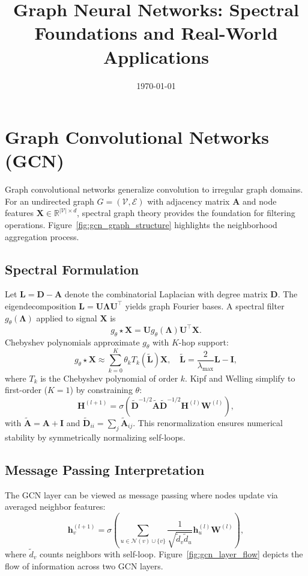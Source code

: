 \documentclass{article}
\title{Graph Neural Networks: Spectral Foundations and Real-World Applications}
\author{}
\date{\today}
\begin{document}
\maketitle
\tableofcontents
\FloatBarrier

\section{Graph Convolutional Networks (GCN)}
Graph convolutional networks generalize convolution to irregular graph domains. For an undirected graph $G = (\mathcal{V}, \mathcal{E})$ with adjacency matrix $\mathbf{A}$ and node features $\mathbf{X} \in \mathbb{R}^{|\mathcal{V}| \times d}$, spectral graph theory provides the foundation for filtering operations. Figure~\ref{fig:gcn_graph_structure} highlights the neighborhood aggregation process.

\subsection{Spectral Formulation}
Let $\mathbf{L} = \mathbf{D} - \mathbf{A}$ denote the combinatorial Laplacian with degree matrix $\mathbf{D}$. The eigendecomposition $\mathbf{L} = \mathbf{U} \boldsymbol{\Lambda} \mathbf{U}^\top$ yields graph Fourier bases. A spectral filter $g_\theta(\boldsymbol{\Lambda})$ applied to signal $\mathbf{X}$ is
\begin{equation}
  g_\theta \star \mathbf{X} = \mathbf{U} g_\theta(\boldsymbol{\Lambda}) \mathbf{U}^\top \mathbf{X}.
\end{equation}
Chebyshev polynomials approximate $g_\theta$ with $K$-hop support:
\begin{equation}
  g_\theta \star \mathbf{X} \approx \sum_{k=0}^{K} \theta_k T_k(\tilde{\mathbf{L}}) \mathbf{X}, \quad \tilde{\mathbf{L}} = \frac{2}{\lambda_{\max}} \mathbf{L} - \mathbf{I},
\end{equation}
where $T_k$ is the Chebyshev polynomial of order $k$. Kipf and Welling simplify to first-order ($K=1$) by constraining $\theta$:
\begin{equation}
  \mathbf{H}^{(l+1)} = \sigma\left(\tilde{\mathbf{D}}^{-1/2} \tilde{\mathbf{A}} \tilde{\mathbf{D}}^{-1/2} \mathbf{H}^{(l)} \mathbf{W}^{(l)}\right),
\end{equation}
with $\tilde{\mathbf{A}} = \mathbf{A} + \mathbf{I}$ and $\tilde{\mathbf{D}}_{ii} = \sum_j \tilde{\mathbf{A}}_{ij}$. This renormalization ensures numerical stability by symmetrically normalizing self-loops.

\subsection{Message Passing Interpretation}
The GCN layer can be viewed as message passing where nodes update via averaged neighbor features:
\begin{equation}
  \mathbf{h}_v^{(l+1)} = \sigma\left(\sum_{u \in \mathcal{N}(v) \cup \{v\}} \frac{1}{\sqrt{\tilde{d}_v \tilde{d}_u}} \mathbf{h}_u^{(l)} \mathbf{W}^{(l)}\right),
\end{equation}
where $\tilde{d}_v$ counts neighbors with self-loop. Figure~\ref{fig:gcn_layer_flow} depicts the flow of information across two GCN layers.
\end{document}
